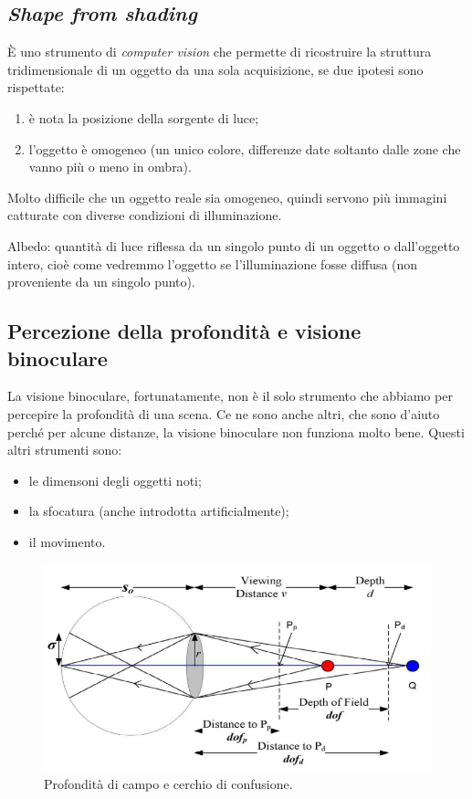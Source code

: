 \documentclass[a4paper,11pt]{article}
\begin{document}
\subsection{\textit{Shape from shading}}
È uno strumento di \textit{computer vision} che permette di ricostruire la struttura tridimensionale di un oggetto da una sola acquisizione, se due ipotesi sono rispettate:
\begin{enumerate}
\item è nota la posizione della sorgente di luce;
\item l'oggetto è omogeneo (un unico colore, differenze date soltanto dalle zone che vanno più o meno in ombra).
\end{enumerate}
Molto difficile che un oggetto reale sia omogeneo, quindi servono più immagini catturate con diverse condizioni di illuminazione.
\par
Albedo: quantità di luce riflessa da un singolo punto di un oggetto o dall'oggetto intero, cioè come vedremmo l'oggetto se l'illuminazione fosse diffusa (non proveniente da un singolo punto).

\subsection{Percezione della profondità e visione binoculare}
La visione binoculare, fortunatamente, non è il solo strumento che abbiamo per percepire la profondità di una scena. Ce ne sono anche altri, che sono d'aiuto
perché per alcune distanze, la visione binoculare non funziona molto bene. Questi altri strumenti sono:
\begin{itemize}
\item le dimensoni degli oggetti noti;
\item la sfocatura (anche introdotta artificialmente);
\item il movimento.
\end{itemize}

\renewcommand{\thefigure}{2.18}
\begin{figure}[!h]
  \centering
    \includegraphics[scale=0.5]{images/2/confusion.png}
    \caption{Profondità di campo e cerchio di confusione.}
\end{figure}
\end{document}
